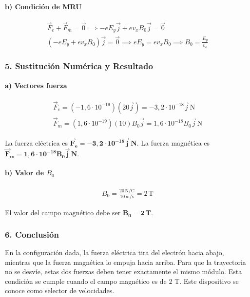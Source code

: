 \paragraph{b) Condición de MRU}
\begin{gather}
    \vec{F}_e + \vec{F}_m = \vec{0} \implies -eE_y\vec{j} + ev_xB_0\vec{j} = \vec{0} \\
    (-eE_y + ev_xB_0)\vec{j} = \vec{0} \implies eE_y = ev_xB_0 \implies B_0 = \frac{E_y}{v_x}
\end{gather}

\subsubsection*{5. Sustitución Numérica y Resultado}
\paragraph{a) Vectores fuerza}
\begin{gather}
    \vec{F}_e = (-1,6 \cdot 10^{-19})(20\vec{j}) = -3,2 \cdot 10^{-18} \vec{j} \, \text{N} \\
    \vec{F}_m = (1,6 \cdot 10^{-19})(10)B_0 \vec{j} = 1,6 \cdot 10^{-18} B_0 \vec{j} \, \text{N}
\end{gather}
\begin{cajaresultado}
    La fuerza eléctrica es $\boldsymbol{\vec{F}_e = -3,2 \cdot 10^{-18} \vec{j} \, \textbf{N}}$. La fuerza magnética es $\boldsymbol{\vec{F}_m = 1,6 \cdot 10^{-18} B_0 \vec{j} \, \textbf{N}}$.
\end{cajaresultado}

\paragraph{b) Valor de $B_0$}
\begin{gather}
    B_0 = \frac{20 \, \text{N/C}}{10 \, \text{m/s}} = 2 \, \text{T}
\end{gather}
\begin{cajaresultado}
    El valor del campo magnético debe ser $\boldsymbol{B_0 = 2 \, \textbf{T}}$.
\end{cajaresultado}

\subsubsection*{6. Conclusión}
\begin{cajaconclusion}
En la configuración dada, la fuerza eléctrica tira del electrón hacia abajo, mientras que la fuerza magnética lo empuja hacia arriba. Para que la trayectoria no se desvíe, estas dos fuerzas deben tener exactamente el mismo módulo. Esta condición se cumple cuando el campo magnético es de 2 T. Este dispositivo se conoce como selector de velocidades.
\end{cajaconclusion}

